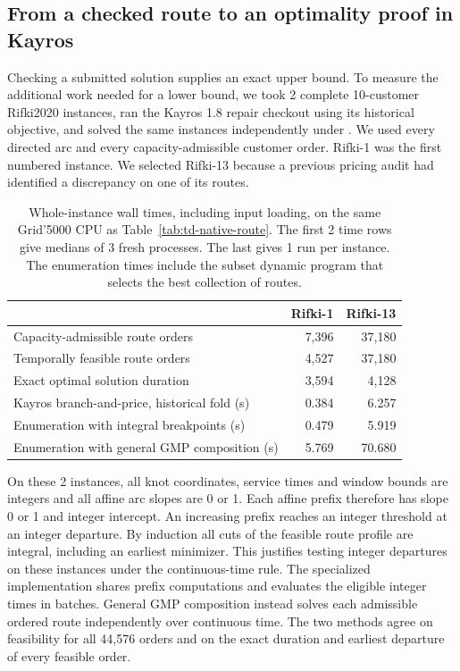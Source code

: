 \subsection{From a checked route to an optimality proof in Kayros}\label{app:td-kayros}

Checking a submitted solution supplies an exact upper bound. To measure the additional work needed for a lower bound, we took 2 complete 10-customer Rifki2020 instances, ran the Kayros 1.8 repair checkout using its historical  objective, and solved the same instances independently under . We used every directed arc and every capacity-admissible customer order. Rifki-1 was the first numbered instance. We selected Rifki-13 because a previous pricing audit had identified a discrepancy on one of its routes.

\begin{table}[htbp]
\centering
\small
\begin{tabular}{@{}lrr@{}}
\toprule
 & Rifki-1 & Rifki-13\\
\midrule
Capacity-admissible route orders & 7,396 & 37,180\\
Temporally feasible route orders & 4,527 & 37,180\\
Exact optimal solution duration & 3,594 & 4,128\\
\midrule
Kayros branch-and-price, historical fold (s) & 0.384 & 6.257\\
Enumeration with integral breakpoints (s) & 0.479 & 5.919\\
Enumeration with general GMP composition (s) & 5.769 & 70.680\\
\bottomrule
\end{tabular}
\caption{Whole-instance wall times, including input loading, on the same Grid'5000 CPU as Table~\ref{tab:td-native-route}. The first 2 time rows give medians of 3 fresh processes. The last gives 1 run per instance. The enumeration times include the subset dynamic program that selects the best collection of routes.}\label{tab:td-kayros-pilot}
\end{table}

On these 2 instances, all knot coordinates, service times and window bounds are integers and all affine arc slopes are 0 or 1. Each affine prefix therefore has slope 0 or 1 and integer intercept. An increasing prefix reaches an integer threshold at an integer departure. By induction all cuts of the feasible route profile are integral, including an earliest minimizer. This justifies testing integer departures on these instances under the continuous-time rule. The specialized implementation shares prefix computations and evaluates the eligible integer times in batches. General GMP composition instead solves each admissible ordered route independently over continuous time. The two methods agree on feasibility for all 44,576 orders and on the exact duration and earliest departure of every feasible order.


